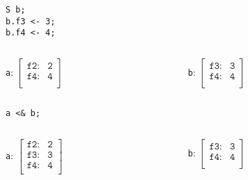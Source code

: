 \documentclass[11pt]{beamer}
\begin{document}
\begin{frame}[fragile]
\begin{lstlisting}[language=lekta]
S b;
b.f3 <- 3;
b.f4 <- 4;
\end{lstlisting}
\small
\vspace{-10pt}
\begin{columns}
	\begin{column}{0.5\textwidth}
		\begin{center}
			\texttt{a}: $\begin{bmatrix}
																				\texttt{f2:}      & \texttt{2}\\ 
																				\texttt{f4:}     	& \texttt{4}\\ 
																			\end{bmatrix}$
		\end{center}
	\end{column}
	\begin{column}{0.5\textwidth}
		\begin{center}
			\texttt{b}: $\begin{bmatrix}
																				\texttt{f3:}      & \texttt{3}\\ 
																				\texttt{f4:}     	& \texttt{4}\\ 
																			\end{bmatrix}$
		\end{center}
	\end{column}
\end{columns}
\begin{center}
\texttt{a <\& b;}
\end{center}
\vspace{-30pt}
\begin{columns}
	\begin{column}{0.5\textwidth}
		\begin{center}
			\texttt{a}: $\begin{bmatrix}
																				\texttt{f2:}      & \texttt{2}\\ 
																				\texttt{f3:}      & \texttt{3}\\ 
																				\texttt{f4:}     	& \texttt{4}\\ 
																			\end{bmatrix}$
		\end{center}
	\end{column}
	\begin{column}{0.5\textwidth}
		\begin{center}
			\texttt{b}: $\begin{bmatrix}
																				\texttt{f3:}      & \texttt{3}\\ 
																				\texttt{f4:}     	& \texttt{4}\\ 
																			\end{bmatrix}$
		\end{center}
	\end{column}
\end{columns}
\end{frame}
\end{document}
